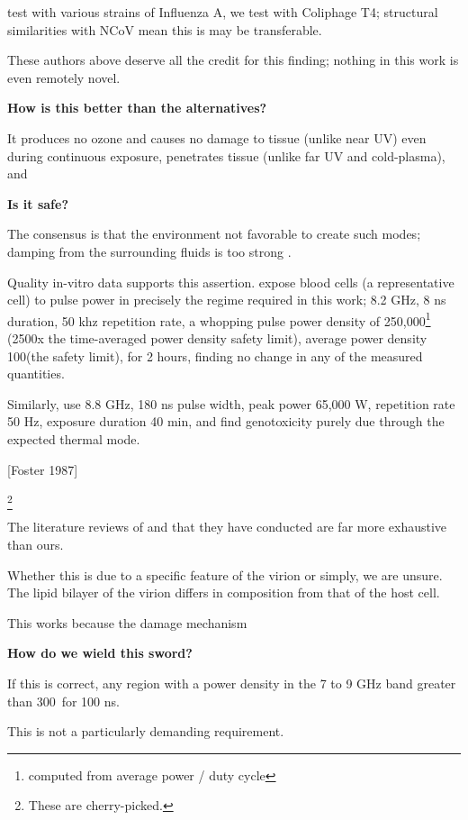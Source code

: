 \documentclass[fleqn,10pt]{paper}
\begin{document}
\cite{Efficient2015} test with various strains of Influenza A, we test with Coliphage T4; structural similarities with NCoV mean this is may be transferable.



These authors above deserve all the credit for this finding; nothing in this work is even remotely novel.

{\Large \textbf{How is this better than the alternatives?}}

It produces no ozone and causes no damage to tissue (unlike near UV) even during continuous exposure, penetrates tissue (unlike far UV and cold-plasma), and 

{\Large \textbf{Is it safe?}}

The consensus is that the environment not favorable to create such modes; damping from the surrounding fluids is too strong \cite{Vibrational2002}. 

Quality in-vitro data supports this assertion. \cite{Cytogenetic2006} expose blood cells (a representative cell) to pulse power in precisely the regime required in this work; 8.2 GHz, 8 ns duration, 50 khz repetition rate, a whopping pulse power density of 250,000\Wsqm\footnote{computed from average power / duty cycle} (2500x the time-averaged power density safety limit), average power density 100\Wsqm (the safety limit), for 2 hours, finding no change in any of the measured quantities. 

Similarly, \cite{DNA2004} use 8.8 GHz, 180 ns pulse width, peak power 65,000 W, repetition rate 50 Hz, exposure duration 40 min, and find genotoxicity purely due through the expected thermal mode. 

[Foster 1987]

\footnote{These are cherry-picked.}

The literature reviews of \cite{ICNIRP2020} and \cite{C95} that they have conducted are far more exhaustive than ours.

Whether this is due to a specific feature of the virion or simply, we are unsure. The lipid bilayer of the virion differs in composition from that of the host cell.

This works because the damage mechanism 

{\Large \textbf{How do we wield this sword?}}

If this is correct, any region with a power density in the 7 to 9 GHz band greater than 300\Wsqm \ for 100 ns.

This is not a particularly demanding requirement.
\end{document}
